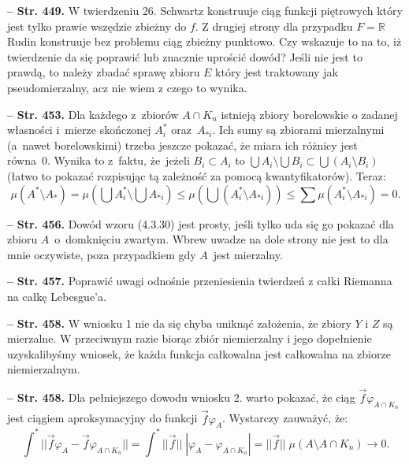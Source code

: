 \documentclass[a4paper]{article}
\newcommand{\mb}{\mathbb}
\newcommand{\tb}{\textbf}
\newcommand{\noi}{\noindent}
\newcommand{\start}{\noi \tb{--} {}}
\newcommand{\Str}[1]{\tb{Str. #1.}}
\begin{document}
\start \Str{449} W twierdzeniu 26. Schwartz konstruuje ciąg funkcji
piętrowych który jest tylko prawie wszędzie zbieżny do $f$. Z drugiej
strony dla przypadku $F = \mb{R}$ Rudin \cite{Rud86} konstruuje bez
problemu ciąg zbieżny punktowo. Czy wskazuje to na to, iż twierdzenie
da się poprawić lub znacznie uprościć dowód? Jeśli nie jest to prawdą,
to należy zbadać sprawę zbioru $E$ który jest traktowany jak
pseudomierzalny, acz nie wiem z czego to wynika.

\start \Str{453} Dla każdego z~zbiorów $A \cap K_{ n }$ istnieją
zbiory borelowskie o zadanej własności i~mierze skończonej
$A_{ i }^{ * }$ oraz~$A_{ * i }$. Ich sumy są zbiorami mierzalnymi
(a~nawet borelowskimi) trzeba jeszcze pokazać, że miara ich różnicy
jest równa~0. Wynika to z~faktu, że~jeżeli $B_{ i } \subset A_{ i }$
to
$\bigcup A_{ i } \setminus \bigcup B_{ i } \subset \bigcup ( A_{ i }
\setminus B_{ i } )$ (łatwo to pokazać rozpisując tą zależność za
pomocą kwantyfikatorów). Teraz:
\begin{displaymath}
  \mu( A^{ * } \setminus A_{ * } ) = \mu\left( \bigcup A^{ * }_{ i }
    \setminus \bigcup A_{ * i } \right) \leq \mu\left( \bigcup
    ( A^{ * }_{ i } \setminus A_{ * i } ) \right) \leq
  \sum \mu( A^{ * }_{ i } \setminus A_{ * i } ) = 0.
\end{displaymath}

\start \Str{456} Dowód wzoru (4.3.30) jest prosty, jeśli tylko uda się
go pokazać dla zbioru $A$~o~domknięciu zwartym. Wbrew uwadze na dole
strony nie jest to dla mnie oczywiste, poza przypadkiem gdy $A$~jest
mierzalny.

\start \Str{457} Poprawić uwagi odnośnie przeniesienia twierdzeń z
całki Riemanna na całkę Lebesgue'a.

\start \Str{458} W wniosku 1 nie da się chyba uniknąć założenia, że
zbiory $Y$ i $Z$ są mierzalne. W przeciwnym razie biorąc zbiór
niemierzalny i jego dopełnienie uzyskalibyśmy wniosek, że każda
funkcja całkowalna jest całkowalna na zbiorze niemierzalnym.

\start \Str{458} Dla pełniejszego dowodu wniosku 2. warto pokazać, że
ciąg $\vec{ f } \varphi_{ A \cap K_{ n } }$ jest ciągiem
aproksymacyjny do funkcji $\vec{ f } \varphi_{ A }$. Wystarczy
zauważyć, że:
\begin{displaymath}
  \int^{ * } || \vec{ f } \varphi_{ A } - \vec{ f }
  \varphi_{ A \cap K_{ n } } || = \int^{ * } || \vec{ f } || \;
  | \varphi_{ A } - \varphi_{ A \cap K_{ n } } | = || \vec{ f } || \;
  \mu( A \setminus A \cap K_{ n } ) \rightarrow 0.
\end{displaymath}
\end{document}
